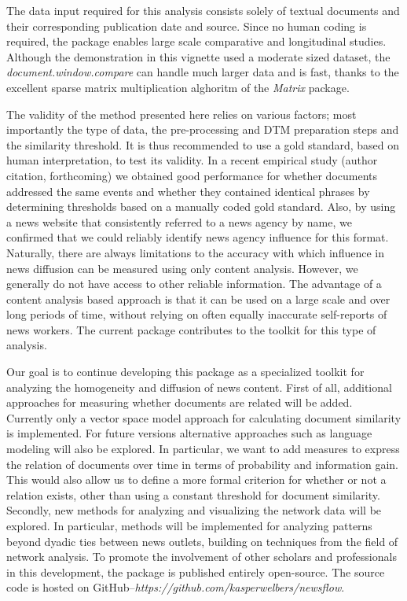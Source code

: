 The data input required for this analysis consists solely of textual documents and their corresponding publication date and source.
Since no human coding is required, the package enables large scale comparative and longitudinal studies.
Although the demonstration in this vignette used a moderate sized dataset, the \emph{document.window.compare} can handle much larger data and is fast, thanks to the excellent sparse matrix multiplication alghoritm of the \emph{Matrix} package.

The validity of the method presented here relies on various factors; most importantly the type of data, the pre-processing and DTM preparation steps and the similarity threshold.
It is thus recommended to use a gold standard, based on human interpretation, to test its validity. 
In a recent empirical study (author citation, forthcoming) we obtained good performance for whether documents addressed the same events and whether they contained identical phrases by determining thresholds based on a manually coded gold standard. 
Also, by using a news website that consistently referred to a news agency by name, we confirmed that we could reliably identify news agency influence for this format. 
Naturally, there are always limitations to the accuracy with which influence in news diffusion can be measured using only content analysis. 
However, we generally do not have access to other reliable information. 
The advantage of a content analysis based approach is that it can be used on a large scale and over long periods of time, without relying on often equally inaccurate self-reports of news workers. 
The current package contributes to the toolkit for this type of analysis. 

Our goal is to continue developing this package as a specialized toolkit for analyzing the homogeneity and diffusion of news content.
First of all, additional approaches for measuring whether documents are related will be added.
Currently only a vector space model approach for calculating document similarity is implemented.
For future versions alternative approaches such as language modeling will also be explored.
In particular, we want to add measures to express the relation of documents over time in terms of probability and information gain.
This would also allow us to define a more formal criterion for whether or not a relation exists, other than using a constant threshold for document similarity.
Secondly, new methods for analyzing and visualizing the network data will be explored. 
In particular, methods will be implemented for analyzing patterns beyond dyadic ties between news outlets, building on techniques from the field of network analysis.
To promote the involvement of other scholars and professionals in this development, the package is published entirely open-source. 
The source code is hosted on GitHub--\emph{https://github.com/kasperwelbers/newsflow}.

